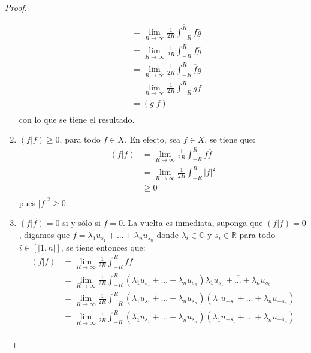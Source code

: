 \documentclass[12pt]{report}
\theoremstyle{largebreak}
\newcommand\abs[1]{\ensuremath{\big|#1\big|}}
\newcommand\pint[2]{\ensuremath{\left(#1\big|#2\right)}}
\newcommand\conj[1]{\ensuremath{\overline{#1}}}
\begin{document}
\begin{proof}
\begin{enumerate}
\begin{equation*}
\begin{split}
                    &=\lim_{R\rightarrow\infty }\conj{\frac{1}{2R}\int_{-R}^{R}f\conj{g}} \\
                    &=\lim_{R\rightarrow\infty }\frac{1}{2R}\int_{-R}^{R}\conj{f\conj{g}} \\
                    &=\lim_{R\rightarrow\infty }\frac{1}{2R}\int_{-R}^{R}\conj{f}g \\
                    &=\lim_{R\rightarrow\infty }\frac{1}{2R}\int_{-R}^{R}g\conj{f} \\
                    &=\pint{g}{f}\\
                \end{split}
            \end{equation*}
            con lo que se tiene el resultado.
            \item $\pint{f}{f}\geq0$, para todo $f\in X$. En efecto, sea $f\in X$, se tiene que:
            \begin{equation*}
                \begin{split}
                    \pint{f}{f}&=\lim_{R\rightarrow\infty }\frac{1}{2R}\int_{-R}^{R}f\conj{f}\\
                    &=\lim_{R\rightarrow\infty }\frac{1}{2R}\int_{-R}^{R}\abs{f}^2 \\
                    &\geq0\\
                \end{split}
            \end{equation*}
            pues $\abs{f}^2\geq0$.
            \item $\pint{f}{f}=0$ si y sólo si $f=0$. La vuelta es inmediata, suponga que $\pint{f}{f}=0$, digamos que $f=\lambda_1 u_{s_1}+...+\lambda_nu_{s_n}$ donde $\lambda_i\in\mathbb{C}$ y $s_i\in\mathbb{R}$ para todo $i\in\left[|1,n|\right]$, se tiene entonces que:
            \begin{equation*}
                \begin{split}
                    \pint{f}{f}&= \lim_{R\rightarrow\infty }\frac{1}{2R}\int_{-R}^{R}f\conj{f}\\
                    &= \lim_{R\rightarrow\infty }\frac{1}{2R}\int_{-R}^{R}(\lambda_1 u_{s_1}+...+\lambda_nu_{s_n})\conj{\lambda_1 u_{s_1}+...+\lambda_nu_{s_n}}\\
                    &= \lim_{R\rightarrow\infty }\frac{1}{2R}\int_{-R}^{R}(\lambda_1 u_{s_1}+...+\lambda_nu_{s_n})(\conj{\lambda_1} u_{-s_1}+...+\conj{\lambda_n}u_{-s_n})\\
                    &= \lim_{R\rightarrow\infty }\frac{1}{2R}\int_{-R}^{R}(\lambda_1 u_{s_1}+...+\lambda_nu_{s_n})(\conj{\lambda_1} u_{-s_1}+...+\conj{\lambda_n}u_{-s_n})\\

\end{split}
\end{equation*}
\end{enumerate}
\end{proof}
\end{document}
